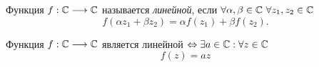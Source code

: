 \begin{definition}
    Функция $ f : \mathbb{C} \longrightarrow \mathbb{C} $ называется \emph{линейной}, если $ \forall \alpha, \beta \in \mathbb{C} \ \forall z_1,z_2 \in \mathbb{C} $
    \[
        f(\alpha z_1 + \beta z_2) = \alpha f(z_1) + \beta f(z_2).
    \]
\end{definition}

\begin{remark}
    Функция $ f: \mathbb{C} \longrightarrow \mathbb{C} $ является линейной $ \Leftrightarrow \exists a \in \mathbb{C} : \forall z \in \mathbb{C} $
    \[
        f(z) = az
    \]
\end{remark}